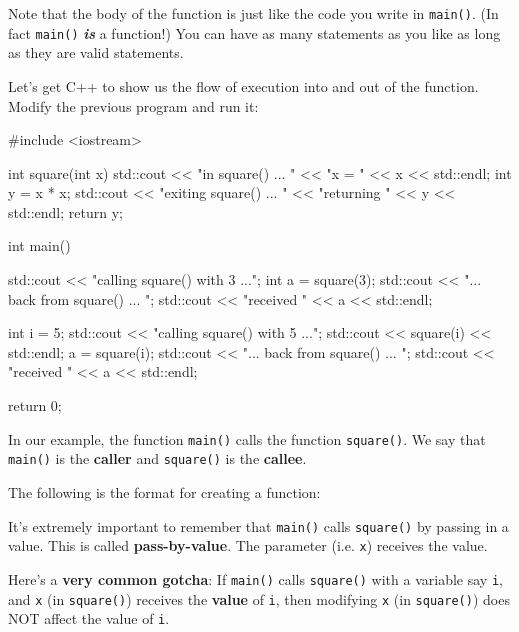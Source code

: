 Note that the body of the function is just like the code you write in \texttt{main()}. (In fact \texttt{main()} \textbf{\textit{is}} a function!) You can have as many statements as you like as long as they are valid statements.

Let's get C++ to show us the flow of execution into and out of the function. Modify the previous program and run it:

\begin{consolethree}[escapeinside=||]
#include <iostream>

int square(int x)
{
    std::cout << "in square() ... "
              << "x = " << x << std::endl;
    int y = x * x;
    std::cout << "exiting square() ... "
              << "returning " << y << std::endl;
    return y;
}

int main()
{
    std::cout << "calling square() with 3 ...";
    int a = square(3);
    std::cout << "... back from square() ... ";
    std::cout << "received " << a << std::endl;

    int i = 5;
    std::cout << "calling square() with 5 ...";
    std::cout << square(i) << std::endl;
    a = square(i);
    std::cout << "... back from square() ... ";
    std::cout << "received " << a << std::endl;

    return 0;
}
\end{consolethree}

In our example, the function \texttt{main()} calls the function \texttt{square()}. We say that \texttt{main()} is the \textbf{caller} and \texttt{square()} is the \textbf{callee}.

The following is the format for creating a function:










\newpage{}

It's extremely important to remember that \texttt{main()} calls \texttt{square()} by passing in a value. This is called \textbf{pass-by-value}. The parameter (i.e. \texttt{x}) receives the value.

Here's a \textbf{very common gotcha}: If \texttt{main()} calls \texttt{square()} with a variable say \texttt{i}, and \texttt{x} (in \texttt{square()}) receives the \textbf{value} of \texttt{i}, then modifying \texttt{x} (in \texttt{square()}) does NOT affect the value of \texttt{i}.

